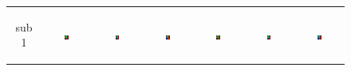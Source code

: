 \documentclass[final,authoryear,5p,twocolumn]{elsarticle}
\begin{document}
\begin{figure}[htb]
\begin{tabular}[]{ccccccc}
      \begin{sideways}sub 1 \end{sideways} &
      \includegraphics[width=0.1\textwidth]{figures/syn/truth/sub01} &
      \includegraphics[width=0.1\textwidth]{figures/syn/smooth_kmeans/sub01} &
      \includegraphics[width=0.1\textwidth]{figures/syn/smooth_ncuts/sub01} &
      \includegraphics[width=0.1\textwidth]{figures/syn/smooth_groupmrf/sub01} &
      \includegraphics[width=0.1\textwidth]{figures/syn/nonsmooth_onelevel/sub01} &
      \includegraphics[width=0.1\textwidth]{figures/syn/nonsmooth_groupmrf/sub01} \\


\end{tabular}
\end{figure}
\end{document}
